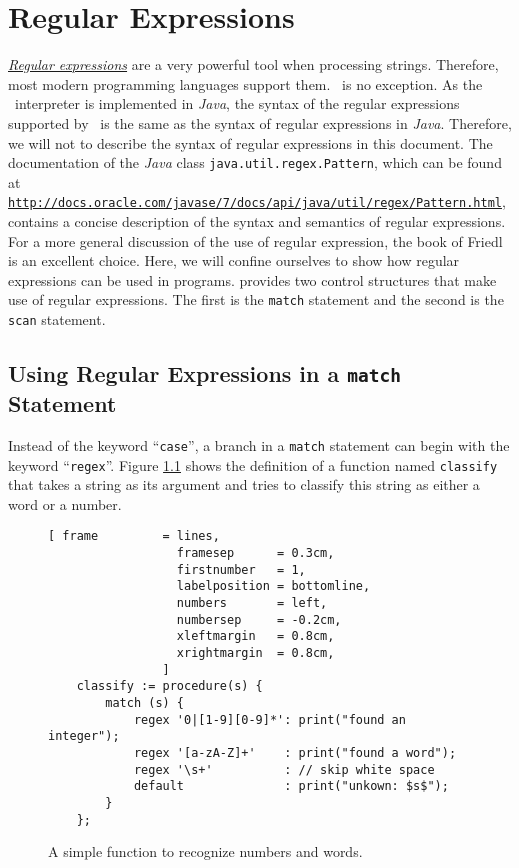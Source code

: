 \chapter{Regular Expressions \label{chapter:regular-expressions}}
\href{http://en.wikipedia.org/wiki/Regular_expression}{\emph{Regular expressions}}
are a very powerful tool when processing strings.
Therefore, most modern programming languages support them.  \setlx\ is no exception.  
As the \setlx\ interpreter is implemented in \textsl{Java}, the syntax of the regular expressions supported by
\setlx\ is the same as the syntax of regular expressions in \textsl{Java}.  Therefore, 
we will not to describe the syntax of regular expressions in this document.  The
documentation of the \textsl{Java} class \texttt{java.util.regex.Pattern}, which can
be found at
\\[0.2cm]
\hspace*{1.3cm}
\href{http://docs.oracle.com/javase/7/docs/api/java/util/regex/Pattern.html}{\texttt{http://docs.oracle.com/javase/7/docs/api/java/util/regex/Pattern.html}},
\\[0.2cm]
contains a concise description of the syntax and semantics of regular expressions.
For a more general discussion of the use of regular expression, the book of Friedl
\cite{friedl:2006} is an excellent choice.
Here, we will confine ourselves to show how regular expressions can be used in
\setlx programs.  \setlx provides two control structures that make use of regular expressions.
The first is the \texttt{match} statement and the second is the \texttt{scan} statement.

\section{Using Regular Expressions in a \texttt{match} Statement}
Instead of the keyword ``\texttt{case}'', a branch in a \texttt{match} statement can begin
with the keyword ``\texttt{regex}''.  Figure \ref{fig:regexp.stlx} shows the definition of
a function named \texttt{classify} that takes a string as its argument
and tries to classify this string as either a word or a number.  


\begin{figure}[!ht]
\centering
\begin{Verbatim}[ frame         = lines, 
                  framesep      = 0.3cm, 
                  firstnumber   = 1,
                  labelposition = bottomline,
                  numbers       = left,
                  numbersep     = -0.2cm,
                  xleftmargin   = 0.8cm,
                  xrightmargin  = 0.8cm,
                ]
    classify := procedure(s) {
        match (s) {
            regex '0|[1-9][0-9]*': print("found an integer");
            regex '[a-zA-Z]+'    : print("found a word");
            regex '\s+'          : // skip white space
            default              : print("unkown: $s$");
        }
    };
\end{Verbatim}
\vspace*{-0.3cm}
\caption{A simple function to recognize numbers and words.}
\label{fig:regexp.stlx}
\end{figure}

